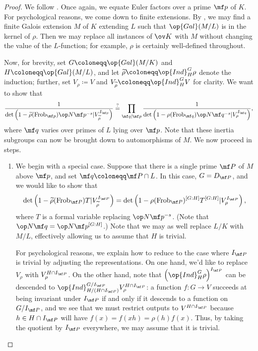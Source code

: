 \documentclass[../thesis.tex]{subfiles}
\begin{document}
\begin{proof}
	We follow \cite[Proposition~VII.10.4(iv)]{neukirch-alg-nt}. Once again, we equate Euler factors over a prime $\mf p$ of $K$. For psychological reasons, we come down to finite extensions. By , we may find a finite Galois extension $M$ of $K$ extending $L$ such that $\op{Gal}(M/L)$ is in the kernel of $\rho$. Then we may replace all instances of $\ov K$ with $M$ without changing the value of the $L$-function; for example, $\rho$ is certainly well-defined throughout.
	
	Now, for brevity, set $G\coloneqq\op{Gal}(M/K)$ and $H\coloneqq\op{Gal}(M/L)$, and let $\widetilde\rho\coloneqq\op{Ind}_H^G\rho$ denote the induction; further, set $V_\rho\coloneqq V$ and $V_{\widetilde\rho}\coloneqq\op{Ind}_H^GV$ for clarity. We want to show that
	\[\frac1{\det\left(1-\widetilde\rho(\mathrm{Frob}_{\mf p})\op N\mf p^{-s}\vert V_{\widetilde\rho}^{I_{\mf p}}\right)}\stackrel?=\prod_{\mf q\mid\mf p}\frac1{\det\left(1-\rho(\mathrm{Frob}_{\mf q})\op N\mf q^{-s}\vert V_{\rho}^{I_{\mf q}}\right)},\]
	where $\mf q$ varies over primes of $L$ lying over $\mf p$. Note that these inertia subgroups can now be brought down to automorphisms of $M$. We now proceed in steps.
	\begin{enumerate}
		\item We begin with a special case. Suppose that there is a single prime $\mf P$ of $M$ above $\mf p$, and set $\mf q\coloneqq\mf P\cap L$. In this case, $G=D_{\mf P}$, and we would like to show that
		\[\det\left(1-\widetilde\rho(\mathrm{Frob}_{\mf P})T\vert V_{\widetilde\rho}^{I_{\mf P}}\right)=\det\left(1-\rho(\mathrm{Frob}_{\mf P})^{[G:H]}T^{[G:H]}\vert V_{\rho}^{I_{\mf P}}\right),\]
		where $T$ is a formal variable replacing $\op N\mf p^{-s}$. (Note that $\op N\mf q=\op N\mf p^{[G:H]}$.) Note that we may as well replace $L/K$ with $M/L$, effectively allowing us to assume that $H$ is trivial.
		
		For psychological reasons, we explain how to reduce to the case where $I_{\mf P}$ is trivial by adjusting the representations. On one hand, we'd like to replace $V_\rho$ with $V_\rho^{H\cap I_{\mf P}}$. On the other hand, note that $\left(\op{Ind}_H^G\rho\right)^{I_{\mf P}}$ can be descended to $\op{Ind}_{H/(H\cap I_{\mf P})}^{G/I_{\mf P}}V_\rho^{H\cap I_{\mf P}}$: a function $f\colon G\to V$ succeeds at being invariant under $I_{\mf P}$ if and only if it descends to a function on $G/I_{\mf P}$, and we see that we must restrict outputs to $V^{H\cap I_{\mf P}}$ because $h\in H\cap I_{\mf P}$ will have $f(x)=f(xh)=\rho(h)f(x)$. Thus, by taking the quotient by $I_{\mf P}$ everywhere, we may assume that it is trivial.


\end{enumerate}
\end{proof}
\end{document}
